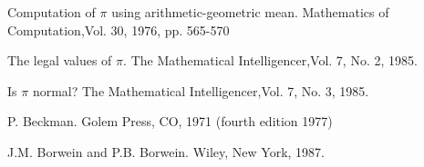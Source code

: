   {Computation of $\pi$ using arithmetic-geometric
  mean.}  {Mathematics of Computation,}{Vol. 30, 1976, pp. 565-570}

  {The legal values of $\pi$.}  {The
  Mathematical Intelligencer,}{Vol. 7, No. 2, 1985.}

  {Is $\pi$ normal?}  {The Mathematical
  Intelligencer,}{Vol. 7, No. 3, 1985.}

\medskip

  {P. Beckman.}  {Golem Press, CO, 1971
  (fourth edition 1977)}

  {J.M. Borwein and P.B. Borwein.}  {Wiley,
  New York, 1987.}

